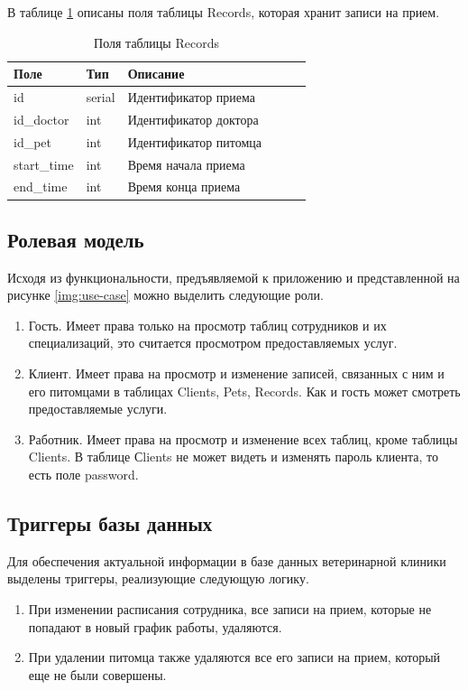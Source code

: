 В таблице \ref{tab:records}  описаны поля таблицы Records, которая хранит записи на прием. 
\begin{table}[hbtp]
		\caption{\label{tab:records}Поля таблицы Records}
	\begin{center}
		\begin{tabular}{|l|l|l|l|l|l|}
			\hline {Поле} & {Тип} & {Описание}  \\ \hline
			id  & serial & Идентификатор приема   \\ \hline
			id\_doctor & int & Идентификатор доктора  \\ \hline
			id\_pet & int & Идентификатор питомца   \\ \hline
			start\_time & int & Время начала приема\\ \hline
			end\_time & int & Время конца приема\\ \hline
		\end{tabular}
	\end{center}
\end{table}

\pagebreak

\subsection{Ролевая модель}
Исходя из функциональности, предъявляемой к приложению и представленной на рисунке \ref{img:use-case} можно выделить следующие роли.
\begin{enumerate}[label=\arabic*)]
	\item Гость. Имеет права только на просмотр таблиц сотрудников и их специализаций, это считается просмотром предоставляемых услуг.
	\item Клиент. Имеет права на просмотр и изменение записей, связанных с ним и его питомцами в таблицах Clients, Pets, Records. Как и гость может смотреть предоставляемые услуги.
	\item Работник. Имеет права на просмотр и изменение всех таблиц, кроме таблицы Clients. В таблице Сlients не может видеть и изменять пароль клиента, то есть поле password.  
\end{enumerate}

\subsection{Триггеры базы данных}

Для обеспечения актуальной информации в базе данных ветеринарной клиники выделены триггеры, реализующие следующую логику.
\begin{enumerate}[label=\arabic*)]
	\item При изменении расписания сотрудника, все записи на прием, которые не попадают в новый график работы, удаляются. 
	\item При удалении питомца также удаляются все его записи на прием, который еще не были совершены.
\end{enumerate}

